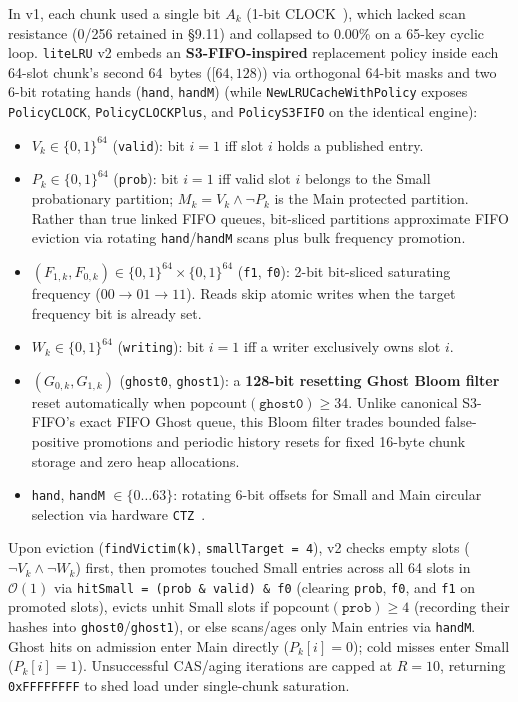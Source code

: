\documentclass[11pt,a4paper]{article}
\begin{document}
In v1, each chunk used a single bit $A_k$ (1-bit CLOCK~\cite{clock1969}), which lacked scan resistance (0/256 retained in \S 9.11) and collapsed to 0.00\% on a 65-key cyclic loop. \texttt{liteLRU} v2 embeds an \textbf{S3-FIFO-inspired} replacement policy inside each 64-slot chunk's second 64~bytes ($[64,128)$) via orthogonal 64-bit masks and two 6-bit rotating hands (\texttt{hand}, \texttt{handM}) (while \texttt{NewLRUCacheWithPolicy} exposes \texttt{PolicyCLOCK}, \texttt{PolicyCLOCKPlus}, and \texttt{PolicyS3FIFO} on the identical engine):

\begin{itemize}
    \item $V_k \in \{0,1\}^{64}$ (\texttt{valid}): bit $i = 1$ iff slot $i$ holds a published entry.
    \item $P_k \in \{0,1\}^{64}$ (\texttt{prob}): bit $i = 1$ iff valid slot $i$ belongs to the Small probationary partition; $M_k = V_k \land \neg P_k$ is the Main protected partition. Rather than true linked FIFO queues, bit-sliced partitions approximate FIFO eviction via rotating \texttt{hand}/\texttt{handM} scans plus bulk frequency promotion.
    \item $(F_{1,k}, F_{0,k}) \in \{0,1\}^{64} \times \{0,1\}^{64}$ (\texttt{f1}, \texttt{f0}): 2-bit bit-sliced saturating frequency ($00 \to 01 \to 11$). Reads skip atomic writes when the target frequency bit is already set.
    \item $W_k \in \{0,1\}^{64}$ (\texttt{writing}): bit $i = 1$ iff a writer exclusively owns slot $i$.
    \item $(G_{0,k}, G_{1,k})$ (\texttt{ghost0}, \texttt{ghost1}): a \textbf{128-bit resetting Ghost Bloom filter} reset automatically when $\text{popcount}(\texttt{ghost0}) \ge 34$. Unlike canonical S3-FIFO's exact FIFO Ghost queue, this Bloom filter trades bounded false-positive promotions and periodic history resets for fixed 16-byte chunk storage and zero heap allocations.
    \item \texttt{hand}, \texttt{handM} $\in \{0 \dots 63\}$: rotating 6-bit offsets for Small and Main circular selection via hardware \texttt{CTZ}~\cite{inteltzcnt,armclz}.
\end{itemize}

Upon eviction (\texttt{findVictim(k)}, \texttt{smallTarget = 4}), v2 checks empty slots ($\neg V_k \land \neg W_k$) first, then promotes touched Small entries across all 64 slots in $\mathcal{O}(1)$ via \texttt{hitSmall = (prob \& valid) \& f0} (clearing \texttt{prob}, \texttt{f0}, and \texttt{f1} on promoted slots), evicts unhit Small slots if $\text{popcount}(\texttt{prob}) \ge 4$ (recording their hashes into \texttt{ghost0}/\texttt{ghost1}), or else scans/ages only Main entries via \texttt{handM}. Ghost hits on admission enter Main directly ($P_k[i]=0$); cold misses enter Small ($P_k[i]=1$). Unsuccessful CAS/aging iterations are capped at $R=10$, returning \texttt{0xFFFFFFFF} to shed load under single-chunk saturation.
\end{document}

